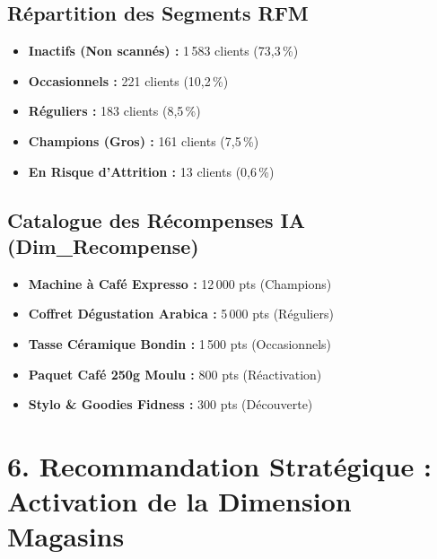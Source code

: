 \documentclass[11pt,a4paper]{article}
\begin{document}
\vspace{0.3cm}
\noindent
\begin{minipage}[t]{0.48\textwidth}
\subsection*{Répartition des Segments RFM}
\begin{itemize}
    \item \textbf{Inactifs (Non scannés) :} 1\,583 clients (73,3\,\%)
    \item \textbf{Occasionnels :} 221 clients (10,2\,\%)
    \item \textbf{Réguliers :} 183 clients (8,5\,\%)
    \item \textbf{Champions (Gros) :} 161 clients (7,5\,\%)
    \item \textbf{En Risque d'Attrition :} 13 clients (0,6\,\%)
\end{itemize}
\end{minipage}
\hfill
\begin{minipage}[t]{0.48\textwidth}
\subsection*{Catalogue des Récompenses IA (Dim\_Recompense)}
\begin{itemize}
    \item \textbf{Machine à Café Expresso :} 12\,000 pts (Champions)
    \item \textbf{Coffret Dégustation Arabica :} 5\,000 pts (Réguliers)
    \item \textbf{Tasse Céramique Bondin :} 1\,500 pts (Occasionnels)
    \item \textbf{Paquet Café 250g Moulu :} 800 pts (Réactivation)
    \item \textbf{Stylo \& Goodies Fidness :} 300 pts (Découverte)
\end{itemize}
\end{minipage}

\newpage

\section*{\textcolor{fidnessblue}{6. Recommandation Stratégique : Activation de la Dimension Magasins}}
\end{document}
